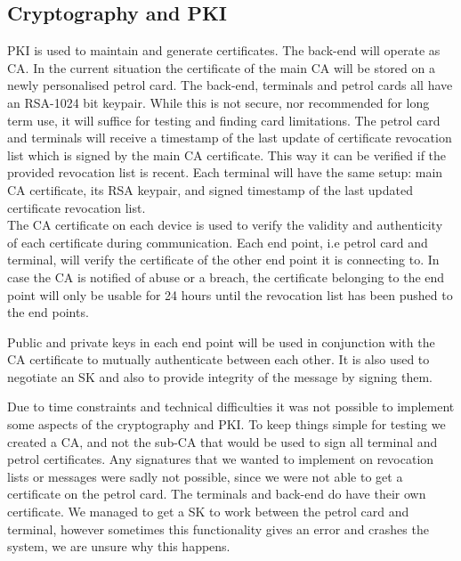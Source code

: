 \subsection{Cryptography and PKI}
PKI is used to maintain and generate certificates. The back-end will operate as CA.  In the current situation the certificate of the main CA will be stored on a newly personalised petrol card. The back-end, terminals and petrol cards all have an RSA-1024 bit keypair. While this is not secure, nor recommended for long term use, it will suffice for testing and finding card limitations. The petrol card and terminals will receive a timestamp of the last update of certificate revocation list which is signed by the main CA certificate. This way it can be verified if the provided revocation list is recent. Each terminal will have the same setup: main CA certificate, its RSA keypair, and signed timestamp of the last updated certificate revocation list. \\

The CA certificate on each device is used to verify the validity and authenticity of each certificate during communication. Each end point, i.e petrol card and terminal, will verify the certificate of the other end point it is connecting to. In case the CA is notified of abuse or a breach, the certificate belonging to the end point will only be usable for 24 hours until the revocation list has been pushed to the end points. %

Public and private keys in each end point will be used in conjunction with the CA certificate to mutually authenticate between each other. It is also used to negotiate an SK and also to provide integrity of the message by signing them. 

Due to time constraints and technical difficulties it was not possible to implement some aspects of the cryptography and PKI. To keep things simple for testing we created a CA, and not the sub-CA that would be used to sign all terminal and petrol certificates. Any signatures that we wanted to implement on revocation lists or messages were sadly not possible, since we were not able to get a certificate on the petrol card. The terminals and back-end do have their own certificate. We managed to get a SK to work between the petrol card and terminal, however sometimes this functionality gives an error and crashes the system, we are unsure why this happens.



